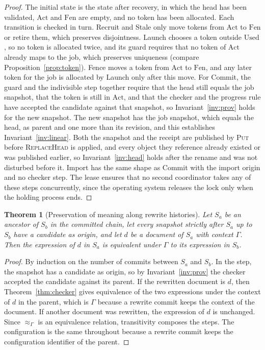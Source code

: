\documentclass[11pt,a4paper]{article}
\theoremstyle{plain}
\newtheorem{theorem}{Theorem}[section]
\theoremstyle{definition}
\theoremstyle{remark}
\theoremstyle{definition}
\newcommand{\eqv}[1]{\approx_{#1}}
\begin{document}
\begin{proof}
The initial state is the state after recovery, in which the head has been validated, $\mathrm{Act}$ and $\mathrm{Fen}$ are empty, and no token has been allocated. Each transition is checked in turn. Recruit and Stale only move tokens from $\mathrm{Act}$ to $\mathrm{Fen}$ or retire them, which preserves disjointness. Launch chooses a token outside $\mathrm{Used}$, so no token is allocated twice, and its guard requires that no token of $\mathrm{Act}$ already maps to the job, which preserves uniqueness (compare Proposition~\ref{prop:token}). Fence moves a token from $\mathrm{Act}$ to $\mathrm{Fen}$, and any later token for the job is allocated by Launch only after this move. For Commit, the guard and the indivisible step together require that the head still equals the job snapshot, that the token is still in $\mathrm{Act}$, and that the checker and the progress rule have accepted the candidate against that snapshot, so Invariant~\ref{inv:prov} holds for the new snapshot. The new snapshot has the job snapshot, which equals the head, as parent and one more than its revision, and this establishes Invariant~\ref{inv:linear}. Both the snapshot and the receipt are published by \textsc{Put} before \textsc{ReplaceHead} is applied, and every object they reference already existed or was published earlier, so Invariant~\ref{inv:head} holds after the rename and was not disturbed before it. Import has the same shape as Commit with the import origin and no checker step. The lease ensures that no second coordinator takes any of these steps concurrently, since the operating system releases the lock only when the holding process ends.
\end{proof}

\begin{theorem}[Preservation of meaning along rewrite histories]
\label{thm:preserve}
Let $S_a$ be an ancestor of $S_b$ in the committed chain, let every snapshot strictly after $S_a$ up to $S_b$ have a candidate as origin, and let $d$ be a document of $S_a$ with context $\Gamma$. Then the expression of $d$ in $S_a$ is equivalent under $\Gamma$ to its expression in $S_b$.
\end{theorem}

\begin{proof}
By induction on the number of commits between $S_a$ and $S_b$. In the step, the snapshot has a candidate as origin, so by Invariant~\ref{inv:prov} the checker accepted the candidate against its parent. If the rewritten document is $d$, then Theorem~\ref{thm:checker} gives equivalence of the two expressions under the context of $d$ in the parent, which is $\Gamma$ because a rewrite commit keeps the context of the document. If another document was rewritten, the expression of $d$ is unchanged. Since $\eqv{\Gamma}$ is an equivalence relation, transitivity composes the steps. The configuration is the same throughout because a rewrite commit keeps the configuration identifier of the parent.
\end{proof}
\end{document}
